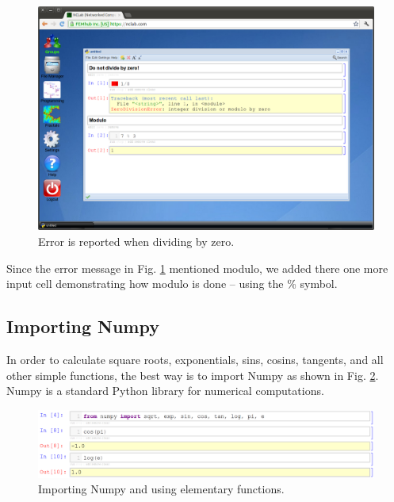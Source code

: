 \documentclass[article,A4,12pt]{llncs}
\begin{document}
\newpage
\begin{figure}[!ht]
\begin{center}
\includegraphics[width=\textwidth]{img/divzero.png}
\end{center}
\caption{Error is reported when dividing by zero.}
\label{fig:divzero}
\end{figure}
\noindent
Since the error message in Fig. \ref{fig:divzero} mentioned modulo, we added there one more 
input cell demonstrating how modulo is done -- using the \% symbol.

\subsection{Importing Numpy}

In order to calculate square roots, exponentials, sins, cosins, tangents, and all other 
simple functions, the best way is to import Numpy as shown in Fig. \ref{fig:fns}. Numpy 
is a standard Python library for numerical computations.

\newpage
\begin{figure}[!ht]
\begin{center}
\includegraphics[width=\textwidth]{img/fns.png}
\end{center}
\vspace{-4mm}
\caption{Importing Numpy and using elementary functions.}
\label{fig:fns}
\end{figure}
\end{document}
